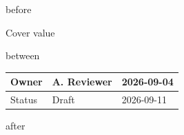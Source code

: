 \documentclass[11pt,a4paper]{article}
\begin{document}
before

Cover value

between

\begin{table}[h]
\begin{tabular}{|l|l|l|}
\hline
Owner & A. Reviewer & 2026-09-04 \\ \hline
Status & Draft & 2026-09-11 \\ \hline
\end{tabular}
\end{table}

after
\end{document}
